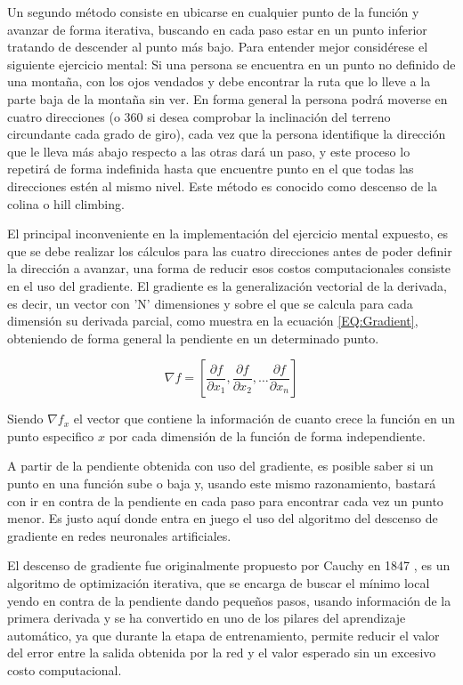         Un segundo método consiste en ubicarse en cualquier punto de la función y avanzar de forma iterativa, buscando en cada paso estar en un punto inferior tratando de descender al punto más bajo. Para entender mejor considérese el siguiente ejercicio mental: Si una persona se encuentra en un punto no definido de una montaña, con los ojos vendados y debe encontrar la ruta que lo lleve a la parte baja de la montaña sin ver. En forma general la persona podrá moverse en cuatro direcciones (o 360 si desea comprobar la inclinación del terreno circundante cada grado de giro), cada vez que la persona identifique la dirección que le lleva más abajo respecto a las otras dará un paso, y este proceso lo repetirá de forma indefinida hasta que encuentre punto en el que todas las direcciones estén al mismo nivel. Este método es conocido como descenso de la colina o hill climbing.
        
        El principal inconveniente en la implementación del ejercicio mental expuesto, es que se debe realizar los cálculos para las cuatro direcciones antes de poder definir la dirección a avanzar, una forma de reducir esos costos computacionales consiste en el uso del gradiente. El gradiente es la generalización vectorial de la derivada, es decir, un vector con 'N' dimensiones y sobre el que se calcula para cada dimensión su derivada parcial, como muestra en la ecuación \ref{EQ:Gradient}, obteniendo de forma general la pendiente en un determinado punto. 
        
        \begin{equation}
            \label{EQ:Gradient}
            \nabla f=\left[\frac{\partial f}{\partial x_1}, \frac{\partial f}{\partial x_2}, \ldots \frac{\partial f}{\partial x_n} \right]
        \end{equation}
        
        Siendo $\nabla f_x$ el vector que contiene la información de cuanto crece la función en un punto especifico $x$ por cada dimensión de la función de forma independiente.
        
        A partir de la pendiente obtenida con uso del gradiente, es posible saber si un punto en una función sube o baja y, usando este mismo razonamiento, bastará con ir en contra de la pendiente en cada paso para encontrar cada vez un punto menor. Es justo aquí donde entra en juego el uso del algoritmo del descenso de gradiente en redes neuronales artificiales.
        
        El descenso de gradiente fue originalmente propuesto por Cauchy en 1847 \cite{Cauchy1847}, es un algoritmo de optimización iterativa, que se encarga de buscar el mínimo local yendo en contra de la pendiente dando pequeños pasos, usando información de la primera derivada y se ha convertido en uno de los pilares del aprendizaje automático, ya que durante la etapa de entrenamiento, permite reducir el valor del error entre la salida obtenida por la red y el valor esperado sin un excesivo costo computacional.
        
